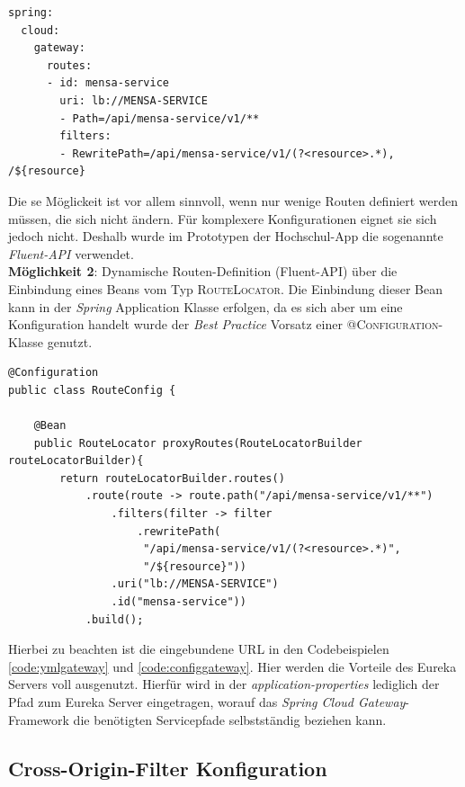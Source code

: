 \begin{lstlisting}[caption={Gateway \textit{application.yml} Datei}, label={code:ymlgateway}]
spring:
  cloud:
    gateway:
      routes:
      - id: mensa-service
        uri: lb://MENSA-SERVICE
     	- Path=/api/mensa-service/v1/**
        filters:
        - RewritePath=/api/mensa-service/v1/(?<resource>.*), /${resource}
\end{lstlisting}

Die se Möglickeit ist vor allem sinnvoll, wenn nur wenige Routen definiert werden müssen, die sich nicht ändern. Für komplexere Konfigurationen eignet sie sich jedoch nicht. Deshalb wurde im Prototypen der Hochschul-\ac{App} die sogenannte \textit{Fluent-\ac{API}} verwendet.\\
\linebreak
\textbf{Möglichkeit 2}: Dynamische Routen-Definition (Fluent-\ac{API}) über die Einbindung eines Beans vom Typ \textsc{RouteLocator}. Die Einbindung dieser Bean kann in der \textit{Spring} Application Klasse erfolgen, da es sich aber um eine Konfiguration handelt wurde der \textit{Best Practice} Vorsatz einer \textsc{@Configuration}-Klasse genutzt.

\begin{lstlisting}[caption={Gateway Routen Konfiguration Klasse}, label={code:configgateway}]
@Configuration
public class RouteConfig {

    @Bean
    public RouteLocator proxyRoutes(RouteLocatorBuilder routeLocatorBuilder){
        return routeLocatorBuilder.routes()
            .route(route -> route.path("/api/mensa-service/v1/**")
                .filters(filter -> filter
                    .rewritePath(
                     "/api/mensa-service/v1/(?<resource>.*)", 
                     "/${resource}"))
                .uri("lb://MENSA-SERVICE")
                .id("mensa-service"))
            .build();
\end{lstlisting}

Hierbei zu beachten ist die eingebundene \ac{URL} in den Codebeispielen \ref{code:ymlgateway} und \ref{code:configgateway}. Hier werden die Vorteile des Eureka Servers voll ausgenutzt. Hierfür wird in der \textit{application-properties} lediglich der Pfad zum Eureka Server eingetragen, worauf das \textit{Spring Cloud Gateway}-Framework die benötigten Servicepfade selbstständig beziehen kann.

\subsection*{Cross-Origin-Filter Konfiguration}

